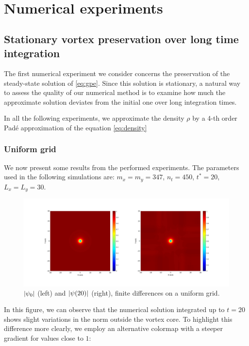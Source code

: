 \chapter{Numerical experiments}
\label{chap:experiments}

\section{Stationary vortex preservation over long time integration}

The first numerical experiment we consider concerns the preservation of the steady-state solution of \ref{eq:gpe}. Since this solution is stationary, a natural way to assess the quality of our numerical method is to examine how much the approximate solution deviates from the initial one over long integration times.

In all the following experiments, we approximate the density $\rho$ by a 4-th order Padé approximation of the equation \ref{eq:density}

\subsection{Uniform grid}

We now present some results from the performed experiments. The parameters used in the following simulations are: $m_x = m_y = 347$, $n_t = 450$, $t^* = 20$, $L_x = L_y = 30$.

\begin{figure}[H]
    \centering
    \includegraphics[width=\textwidth]{img/ltufd20t347s30L.pdf}
    \caption{$\left| \psi_0 \right|$ (left) and $\left| \psi(20) \right|$ (right), finite differences on a uniform grid.}
\end{figure}

In this figure, we can observe that the numerical solution integrated up to $t = 20$ shows slight variations in the norm outside the vortex core. To highlight this difference more clearly, we employ an alternative colormap with a steeper gradient for values close to $1$:

